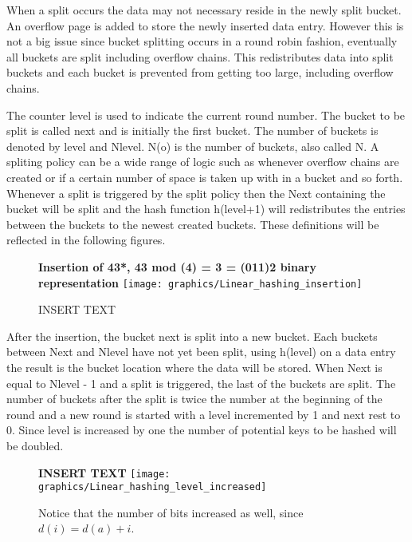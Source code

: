 \documentclass[letterpaper, 12pt]{article}
\begin{document}
When a split occurs the data may not necessary reside in the newly split bucket. An overflow page is
added to store the newly inserted data entry. However this is not a big issue since bucket splitting
occurs in a round robin fashion, eventually all buckets are split including overflow chains.
This redistributes data into split buckets and each bucket is prevented from getting too large,
including overflow chains.
\par\vspace{\baselineskip}
The counter level is used to indicate the current round number. The bucket to be split is called
next and is initially the first bucket. The number of buckets is denoted by level and Nlevel.
N(o) is the number of buckets, also called N. A spliting policy can be a wide range of logic
such as whenever overflow chains are created or if a certain number of space is taken up with
in a bucket and so forth. Whenever a split is triggered by the split policy then the Next containing
the bucket will be split and the hash function h(level+1) will redistributes the entries
between the buckets to the newest created buckets. These definitions will be reflected in the following
figures.

\begin{figure}
  \centering
  \textbf{Insertion of 43*, 43 mod (4) = 3 = (011)2 binary representation}
  \texttt{[image: graphics/Linear\_hashing\_insertion]}
  \caption{INSERT TEXT}
\end{figure}

\par\vspace{\baselineskip}
After the insertion, the bucket next is split into a new bucket. Each buckets between Next and Nlevel have not yet been split,
using h(level) on a data entry the result is the bucket location where the data will be stored.
When Next is equal to Nlevel - 1 and a split is triggered, the last of the buckets are split. The 
number of buckets after the split is twice the number at the beginning of the round and a new round is 
started with a level incremented by 1 and next rest to 0. Since level is increased by one the number 
of potential keys to be hashed will be doubled.
\par\vspace{\baselineskip}
\begin{figure}
  \centering
  \textbf{INSERT TEXT}
  \texttt{[image: graphics/Linear\_hashing\_level\_increased]}
  \caption{Notice that the number of bits increased as well, since $d(i) = d(a) + i$.}
\end{figure}
\end{document}
